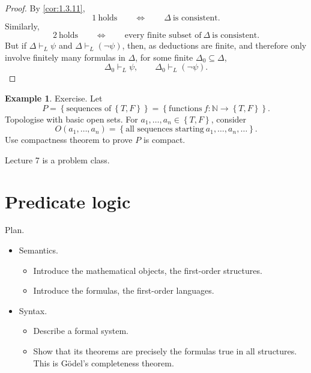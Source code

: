 \documentclass{article}
\newcommand{\N}{\mathbb{N}}
\newcommand{\rb}[1]{\left( #1 \right)}
\newcommand{\cb}[1]{\left\{ #1 \right\}}
\newcommand{\notb}[1]{\rb{\neg #1}}
\theoremstyle{definition}\newtheorem{definition}{Definition}[subsection]
\theoremstyle{definition}\newtheorem{remark1}[definition]{Remark}
\theoremstyle{definition}\newtheorem{example1}[definition]{Example}
\theoremstyle{definition}\newtheorem*{remark2}{Remark}
\theoremstyle{definition}\newtheorem*{example2}{Example}
\theoremstyle{definition}\newtheorem*{note}{Note}
\theoremstyle{definition}\newtheorem*{notation}{Notation}
\begin{document}
\begin{proof}
By \ref{cor:1.3.11},
$$ 1 \ \text{holds} \qquad \iff \qquad \Delta \ \text{is consistent}. $$
Similarly,
$$ 2 \ \text{holds} \qquad \iff \qquad \text{every finite subset of} \ \Delta \ \text{is consistent}. $$
But if $ \Delta \vdash_L \psi $ and $ \Delta \vdash_L \notb{\psi} $, then, as deductions are finite, and therefore only involve finitely many formulas in $ \Delta $, for some finite $ \Delta_0 \subseteq \Delta $,
$$ \Delta_0 \vdash_L \psi, \qquad \Delta_0 \vdash_L \notb{\psi}. $$
\end{proof}

\begin{example2}
Exercise. Let
$$ P = \cb{\text{sequences of} \ \cb{T, F}} = \cb{\text{functions} \ f : \N \to \cb{T, F}}. $$
Topologise with basic open sets. For $ a_1, \dots, a_n \in \cb{T, F} $, consider
$$ O\rb{a_1, \dots, a_n} = \cb{\text{all sequences starting} \ a_1, \dots, a_n, \dots}. $$
Use compactness theorem to prove $ P $ is compact.
\end{example2}


Lecture 7 is a problem class.

\pagebreak


\section{Predicate logic}

Plan.
\begin{itemize}
\item Semantics.
\begin{itemize}
\item Introduce the mathematical objects, the first-order structures.
\item Introduce the formulas, the first-order languages.
\end{itemize}
\item Syntax.
\begin{itemize}
\item Describe a formal system.
\item Show that its theorems are precisely the formulas true in all structures. This is G\"odel's completeness theorem.
\end{itemize}
\end{itemize}
\end{document}
